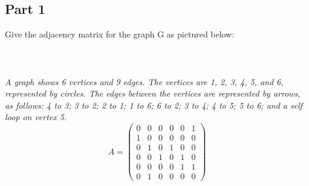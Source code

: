 \documentclass{amsart}
\theoremstyle{definition}
\theoremstyle{Exercise}
\theoremstyle{remark}
\theoremstyle{rule}
\numberwithin{equation}{section}
\begin{document}
\subsection*{Part 1}
Give the adjacency matrix for the graph G as pictured below:\\
\\
\\\\
{\color{blue}{\bf Figure 2:} \emph{A graph shows 6 vertices and 9 edges. The vertices are 1, 2, 3, 4, 5, and 6, represented by circles. The edges between the vertices are represented by arrows, as follows: 4 to 3; 3 to 2; 2 to 1; 1 to 6; 6 to 2; 3 to 4; 4 to 5; 5 to 6; and a self loop on vertex 5.
}
}\\
\[
A = \left( \begin{array}{cccccc}
0 & 0 & 0 & 0 & 0 & 1\\
1 & 0 & 0 & 0 & 0 & 0\\
0 & 1 & 0 & 1 & 0 & 0\\
0 & 0 & 1 & 0 & 1 & 0\\
0 & 0 & 0 & 0 & 1 & 1\\
0 & 1 & 0 & 0 & 0 & 0
\end{array} \right)
\]
\\\\
\end{document}
